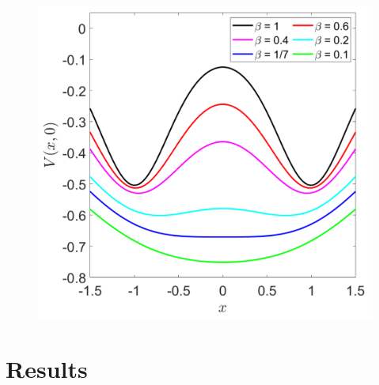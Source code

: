 \documentclass[10pt,aps,onecolumn,superscriptaddress]{revtex4-2}
\begin{document}
\begin{figure}
    \centering
    \includegraphics[scale=0.36]{pitcfork_bif_c_1div2_a_1_d_1}
    \caption{}
    \label{fig:pitchfork_bif}
\end{figure}

\section{Results}
\label{sec:results}
\end{document}
